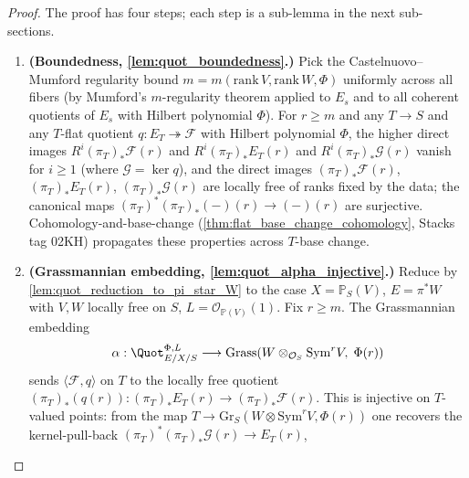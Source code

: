 \begin{proof}
  
  The proof has four steps; each step is a sub-lemma in the next
  sub-sections.
  \begin{enumerate}
    \item \textbf{(Boundedness, \cref{lem:quot_boundedness}.)} Pick the
      Castelnuovo--Mumford regularity bound \(m = m(\mathrm{rank}\,V,
      \mathrm{rank}\,W, \Phi)\) uniformly across all fibers (by Mumford's
      \(m\)-regularity theorem applied to \(E_s\) and to all coherent
      quotients of \(E_s\) with Hilbert polynomial \(\Phi\)). For \(r \ge m\)
      and any \(T \to S\) and any \(T\)-flat quotient
      \(q : E_T \twoheadrightarrow \mathcal{F}\) with Hilbert polynomial
      \(\Phi\), the higher direct images \(R^i (\pi_T)_* \mathcal{F}(r)\)
      and \(R^i (\pi_T)_* E_T(r)\) and \(R^i (\pi_T)_* \mathcal{G}(r)\)
      vanish for \(i \ge 1\) (where \(\mathcal{G} = \ker q\)), and the
      direct images \((\pi_T)_* \mathcal{F}(r)\), \((\pi_T)_* E_T(r)\),
      \((\pi_T)_* \mathcal{G}(r)\) are locally free of ranks fixed by the
      data; the canonical maps \((\pi_T)^* (\pi_T)_*(-)(r) \to (-)(r)\)
      are surjective. Cohomology-and-base-change (\cref{thm:flat_base_change_cohomology},
      Stacks tag 02KH) propagates these properties across \(T\)-base change.
    \item \textbf{(Grassmannian embedding, \cref{lem:quot_alpha_injective}.)}
      Reduce by \cref{lem:quot_reduction_to_pi_star_W} to the case
      \(X = \mathbb{P}_S(V)\), \(E = \pi^* W\) with \(V, W\) locally free
      on \(S\), \(L = \mathcal{O}_{\mathbb{P}(V)}(1)\). Fix \(r \ge m\).
      The Grassmannian embedding
      \[
        \alpha : \Quot^{\Phi,L}_{E/X/S} \longrightarrow
        \mathrm{Grass}\!\left(
          W \otimes_{\mathcal{O}_S} \mathrm{Sym}^r V,\; \Phi(r)
        \right)
      \]
      sends \(\langle \mathcal{F}, q\rangle\) on \(T\) to the locally free
      quotient \((\pi_T)_*(q(r)) : (\pi_T)_* E_T(r) \to (\pi_T)_* \mathcal{F}(r)\).
      This is injective on \(T\)-valued points: from the map \(T \to
      \mathrm{Gr}_S(W \otimes \mathrm{Sym}^r V, \Phi(r))\) one recovers
      the kernel-pull-back \((\pi_T)^* (\pi_T)_* \mathcal{G}(r) \to E_T(r)\),

\end{enumerate}
\end{proof}
